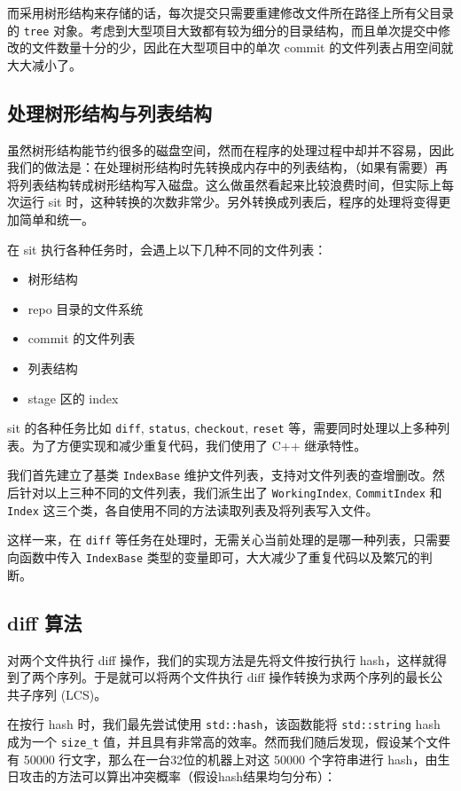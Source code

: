 而采用树形结构来存储的话，每次提交只需要重建修改文件所在路径上所有父目录的
\texttt{tree}
对象。考虑到大型项目大致都有较为细分的目录结构，而且单次提交中修改的文件数量十分的少，因此在大型项目中的单次
commit 的文件列表占用空间就大大减小了。

\subsection{处理树形结构与列表结构}

虽然树形结构能节约很多的磁盘空间，然而在程序的处理过程中却并不容易，因此我们的做法是：在处理树形结构时先转换成内存中的列表结构，（如果有需要）再将列表结构转成树形结构写入磁盘。这么做虽然看起来比较浪费时间，但实际上每次运行
sit
时，这种转换的次数非常少。另外转换成列表后，程序的处理将变得更加简单和统一。

在 sit 执行各种任务时，会遇上以下几种不同的文件列表：

\begin{itemize}
\item
  树形结构
\item
  repo 目录的文件系统
\item
  commit 的文件列表
\item
  列表结构
\item
  stage 区的 index
\end{itemize}

sit 的各种任务比如 \texttt{diff}, \texttt{status}, \texttt{checkout},
\texttt{reset}
等，需要同时处理以上多种列表。为了方便实现和减少重复代码，我们使用了 C++
继承特性。

我们首先建立了基类 \texttt{IndexBase}
维护文件列表，支持对文件列表的查增删改。然后针对以上三种不同的文件列表，我们派生出了
\texttt{WorkingIndex}, \texttt{CommitIndex} 和 \texttt{Index}
这三个类，各自使用不同的方法读取列表及将列表写入文件。

这样一来，在 \texttt{diff}
等任务在处理时，无需关心当前处理的是哪一种列表，只需要向函数中传入
\texttt{IndexBase} 类型的变量即可，大大减少了重复代码以及繁冗的判断。

\subsection{diff 算法}

对两个文件执行 diff 操作，我们的实现方法是先将文件按行执行
hash，这样就得到了两个序列。于是就可以将两个文件执行 diff
操作转换为求两个序列的最长公共子序列 (LCS)。

在按行 hash 时，我们最先尝试使用 \texttt{std::hash}，该函数能将
\texttt{std::string} hash 成为一个 \texttt{size\_t}
值，并且具有非常高的效率。然而我们随后发现，假设某个文件有 50000
行文字，那么在一台32位的机器上对这 50000 个字符串进行
hash，由生日攻击的方法可以算出冲突概率（假设hash结果均匀分布）：

